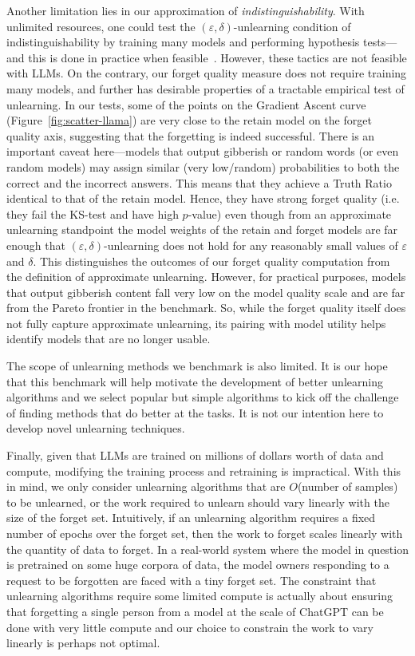 Another limitation lies in our approximation of \emph{indistinguishability}.
With unlimited resources, one could test the $(\varepsilon, \delta)$-unlearning condition of indistinguishability \citep{bourtoule2021machine, sekhari2021remember} by training many models and performing hypothesis tests---and this is done in practice when feasible~\citep{carlini2022membership, pawelczyk2023context}. 
However, these tactics are not feasible with LLMs.
On the contrary, our forget quality measure does not require training many models, and further has desirable properties of a tractable empirical test of unlearning.
In our tests, some of the points on the Gradient Ascent curve (Figure~\ref{fig:scatter-llama}) are very close to the retain model on the forget quality axis, suggesting that the forgetting is indeed successful. 
There is an important caveat here---models that output gibberish or random words (or even random models) may assign similar (very low/random) probabilities to both the correct and the incorrect answers. 
This means that they achieve a Truth Ratio identical to that of the retain model. 
Hence, they have strong forget quality (i.e. they fail the KS-test and have high $p$-value) even though from an approximate unlearning standpoint the model weights of the retain and forget models are far enough that $(\varepsilon, \delta)$-unlearning does not hold for any reasonably small values of $\varepsilon$ and  $\delta$.
This distinguishes the outcomes of our forget quality computation from the definition of approximate unlearning. 
However, for practical purposes, models that output gibberish content fall very low on the model quality scale and are far from the Pareto frontier in the \tofu{} benchmark. 
So, while the forget quality itself does not fully capture approximate unlearning, its pairing with model utility helps identify models that are no longer usable.

The scope of unlearning methods we benchmark is also limited. 
It is our hope that this benchmark will help motivate the development of better unlearning algorithms and we select popular but simple algorithms to kick off the challenge of finding methods that do better at the \tofu{} tasks.
It is not our intention here to develop novel unlearning techniques.

Finally, given that LLMs are trained on millions of dollars worth of data and compute, modifying the training process and retraining is impractical. 
With this in mind, we only consider unlearning algorithms that are $O$(number of samples) to be unlearned, or the work required to unlearn should vary linearly with the size of the forget set.
Intuitively, if an unlearning algorithm requires a fixed number of epochs over the forget set, then the work to forget scales linearly with the quantity of data to forget.
In a real-world system where the model in question is pretrained on some huge corpora of data, the model owners responding to a request to be forgotten are faced with a tiny forget set.
The constraint that unlearning algorithms require some limited compute is actually about ensuring that forgetting a single person from a model at the scale of ChatGPT can be done with very little compute and our choice to constrain the work to vary linearly is perhaps not optimal.

